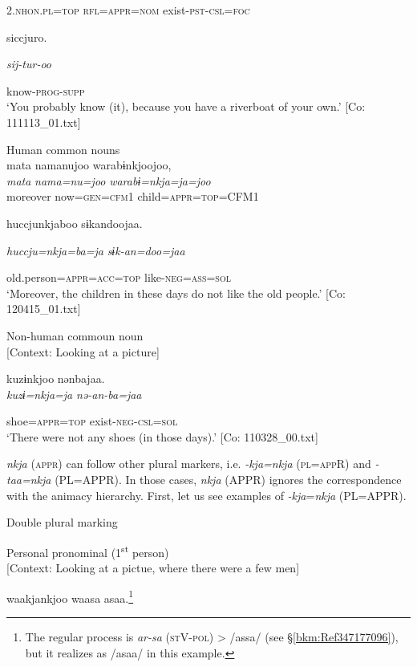 \begin{table}
      2.\textsc{nhon}.\textsc{pl}=\textsc{top}  \textsc{rfl}=\textsc{appr}=\textsc{nom}  exist-\textsc{pst}-\textsc{csl}=\textsc{foc}

      siccjuro.

      \textit{sij-tur-oo}

      know-\textsc{prog}-\textsc{supp}\\
\glt ‘You probably know (it), because you have a riverboat of your own.’ [Co: 111113\_01.txt]
\z

\ex Human common nouns\\
{\TM}
\glll  mata  namanujoo  warabɨnkjoojoo,\\
\textit{mata}  \textit{nama=nu=joo}  \textit{warabɨ=nkja=ja=joo}\\
moreover  now=\textsc{gen}=\textsc{cfm}1  child=\textsc{appr}=\textsc{top}=CFM1

      huccjunkjaboo  sɨkandoojaa.

      \textit{huccju=nkja=ba=ja}  \textit{sɨk-an=doo=jaa}

      old.person=\textsc{appr}=\textsc{acc}=\textsc{top}  like-\textsc{neg}=\textsc{ass}=\textsc{sol}\\
\glt ‘Moreover, the children in these days do not like the old people.’ [Co: 120415\_01.txt]
\z

\ex Non-human commoun noun\\{}
[Context: Looking at a picture]

{\TM}
\glll kuzɨnkjoo  nənbajaa.\\

      \textit{kuzɨ=nkja=ja}  \textit{nə-an-ba=jaa}

      shoe=\textsc{appr}=\textsc{top}  exist-\textsc{neg}-\textsc{csl}=\textsc{sol}\\
\glt ‘There were not any shoes (in those days).’ [Co: 110328\_00.txt]
\z

  \textit{nkja} (\textsc{appr}) can follow other plural markers, i.e. \textit{-kja=nkja} (\textsc{pl}=\textsc{app}R) and \textit{-taa=nkja} (PL=APPR). In those cases, \textit{nkja} (APPR) ignores the correspondence with the animacy hierarchy. First, let us see examples of \textit{-kja}=\textit{nkja} (PL=APPR).

\ea\label{ex:6-102}
  Double plural marking

 \ea Personal pronominal (1\textsuperscript{st} person)\\{}
[Context: Looking at a pictue, where there were a few men]

{\TM}
\glll waakjankjoo  waasa  asaa.\footnote{The regular process is \textit{ar-sa} (\textsc{st}V-\textsc{pol}) > /assa/ (see §\ref{bkm:Ref347177096}), but it realizes as /asaa/ in this example.}\\


\end{table}
